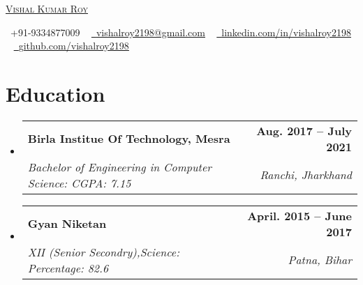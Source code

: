\documentclass[letterpaper,11pt]{article}
\makeatletter
\newcommand{\resumeSubheading}[4]{
  \vspace{-2pt}\item
    \begin{tabular*}{1.0\textwidth}[t]{l@{\extracolsep{\fill}}r}
      \textbf{#1} & \textbf{\small #2} \\
      \textit{\small#3} & \textit{\small #4} \\
    \end{tabular*}\vspace{-7pt}
}
\newcommand{\resumeSubHeadingListStart}{\begin{itemize}[leftmargin=0.0in, label={}]}
\newcommand{\resumeSubHeadingListEnd}{\end{itemize}}
\makeatother
\begin{document}

\begin{center}
    {\Huge \scshape \href{https://linkedin.com/in/vishalroy2198/}{Vishal Kumar Roy}} \\ \vspace{5pt}
    \vspace{5pt}
    
    \small \raisebox{-0.1\height}\faPhone\ +91-9334877009 ~ \href{mailto:vishalroy2198@gmail.com}{\raisebox{-0.2\height}\faEnvelope\  \underline{vishalroy2198@gmail.com}} ~ 
    \href{https://linkedin.com/in/vishalroy2198/}{\raisebox{-0.2\height}\faLinkedin\ \underline{linkedin.com/in/vishalroy2198}}  ~
    \href{https://github.com/vishalroy2198}{\raisebox{-0.2\height}\faGithub\ \underline{github.com/vishalroy2198}}
    \vspace{-8pt}
\end{center}


\section{Education}
  \resumeSubHeadingListStart
    \resumeSubheading
      {Birla Institue Of Technology, Mesra}{Aug. 2017 -- July 2021}
      {Bachelor of Engineering in Computer Science: CGPA: 7.15}{Ranchi, Jharkhand }
  
    \resumeSubheading
      {Gyan Niketan}{April. 2015 -- June 2017}
      {XII (Senior Secondry),Science: Percentage: 82.6}{Patna, Bihar }
      
  \resumeSubHeadingListEnd

\end{document}
